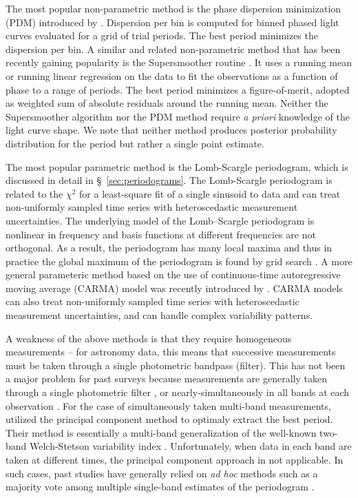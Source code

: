\documentclass[12pt,preprint]{aastex}
\newcommand{\foreign}[1]{{\it #1}}
\newcommand{\apriori}{\foreign{a priori}}
\newcommand{\adhoc}{\foreign{ad hoc}}
\begin{document}
The most popular non-parametric method is the phase dispersion minimization (PDM) introduced by \cite{PDM1978}. 
Dispersion per bin is computed for binned phased light curves evaluated for a grid of trial periods. The best
period minimizes the dispersion per bin.  A similar and related non-parametric method that has been recently 
gaining popularity is the Supersmoother routine \citep{Reimann94}. It uses a running mean or running linear 
regression on the data to fit the observations as a function of phase to a range of periods. The best period 
minimizes a figure-of-merit, adopted as weighted sum of absolute residuals around the running mean. 
Neither the Supersmoother algorithm nor the PDM method require \apriori{} knowledge of the light curve shape. 
We note that neither method produces posterior probability distribution for the period but rather a single point 
estimate. 

The most popular parametric method is the Lomb-Scargle periodogram, which is discussed in detail in \S~\ref{sec:periodograms}.
The Lomb-Scargle periodogram is related to the $\chi^2$ for a least-square fit of a single sinusoid to data
and can treat non-uniformly sampled time series with heteroscedastic measurement uncertainties. 
The underlying model of the Lomb–Scargle periodogram is nonlinear in frequency and basis functions at different
frequencies are not orthogonal. As a result, the periodogram has many local maxima and thus in practice the global 
maximum of the periodogram is found by grid search \citep[for details see, e.g.][]{ICVG2014}.
A more general parameteric method based on the use of continuous-time autoregressive moving average (CARMA) model
was recently introduced by \citep{Kelly14}. CARMA models can also treat non-uniformly sampled time series with 
heteroscedastic measurement uncertainties, and can handle complex variability patterns. 

A weakness of the above methods is that they require homogeneous measurements -- for astronomy data, this means 
that successive measurements must be taken through a single photometric bandpass (filter). This has not been a major
problem for past surveys because measurements are generally taken through a single photometric filter 
\citep [e.g. LINEAR,][]{LINEAR1}, or nearly-simultaneously in all bands at each observation \citep [e.g. SDSS,][]{Sesar2010}.
For the case of simultaneously taken multi-band measurements, \cite{Suveges12} utilized the principal component
method to optimaly extract the best period. Their method is essentially a multi-band generalization of the well-known
two-band Welch-Stetson variability index \citep{Stetson1996}. Unfortunately, when data in each band are taken at
different times, the  principal component approach in not applicable. In such cases, past studies have generally relied 
on \adhoc{} methods such as a majority vote among multiple single-band estimates of the 
periodogram \citep[e.g.,][]{Oluseyi12}. 
\end{document}

